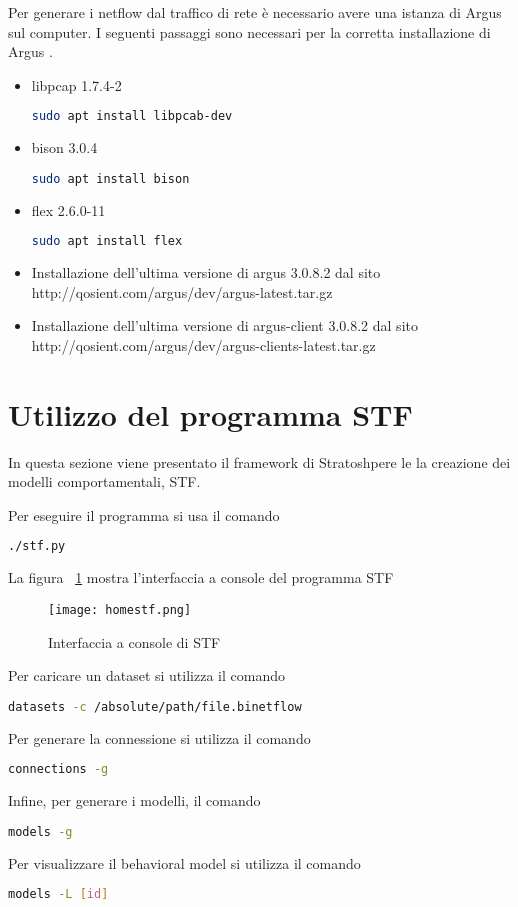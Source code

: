 \documentclass[../main.tex]{subfiles}
\begin{document}
Per generare i netflow dal traffico di rete è necessario avere una istanza di Argus sul computer. I seguenti passaggi sono necessari per la corretta installazione di Argus \cite{stf}.
\begin{itemize}
				\item libpcap 1.7.4-2
\begin{lstlisting}[language=bash]
 sudo apt install libpcab-dev
\end{lstlisting}
\item bison 3.0.4
\begin{lstlisting}[language=bash]
 sudo apt install bison
\end{lstlisting}
\item flex 2.6.0-11
\begin{lstlisting}[language=bash]
 sudo apt install flex
\end{lstlisting}
\item Installazione dell'ultima versione di argus 3.0.8.2 dal sito\\ http://qosient.com/argus/dev/argus-latest.tar.gz
\item Installazione dell'ultima versione di argus-client 3.0.8.2 dal sito\\ http://qosient.com/argus/dev/argus-clients-latest.tar.gz
\end{itemize}

\section{Utilizzo del programma STF\\}
In questa sezione viene presentato il framework di Stratoshpere le la creazione dei modelli comportamentali, STF. 

Per eseguire il programma si usa il comando
\begin{lstlisting}[language=bash]
	./stf.py
\end{lstlisting}
La figura ~\ref{fig:homestf} mostra l'interfaccia a console del programma STF
\begin{figure}[H]
				\centering
				\texttt{[image: homestf.png]}
				\caption{Interfaccia a console di STF}
				\label{fig:homestf}
\end{figure}

Per caricare un dataset si utilizza il comando
\begin{lstlisting}[language=bash]
	datasets -c /absolute/path/file.binetflow	
\end{lstlisting}

Per generare la connessione si utilizza il comando
\begin{lstlisting}[language=bash]
	connections -g	
\end{lstlisting}

Infine, per generare i modelli, il comando
\begin{lstlisting}[language=bash]
	models -g	
\end{lstlisting}

Per visualizzare il behavioral model si utilizza il comando
\begin{lstlisting}[language=bash]
	models -L [id]	
\end{lstlisting}
\end{document}
